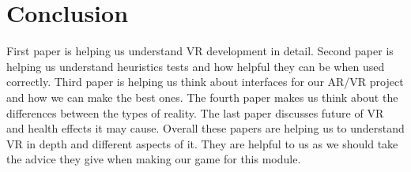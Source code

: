 \documentclass{scrartcl}
\begin{document}
\section{Conclusion}
First paper is helping us understand VR development in detail. Second paper is helping us understand heuristics tests and how helpful they can be when used correctly. Third paper is helping us think about interfaces for our AR/VR project and how we can make the best ones. The fourth paper makes us think about the differences between the types of reality. The last paper discusses future of VR and health effects it may cause. Overall these papers are helping us to understand VR in depth and different aspects of it. They are helpful to us as we should take the advice they give when making our game for this module.



\end{document}
